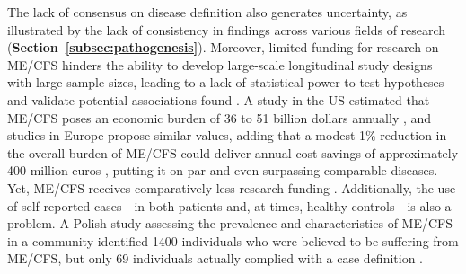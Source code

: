 The lack of consensus on disease definition also generates uncertainty, as illustrated by the lack of consistency in findings across various fields of research (\textbf{Section~\ref{subsec:pathogenesis}}).
Moreover, limited funding for research on ME/CFS hinders the ability to develop large-scale longitudinal study designs with large sample sizes, leading to a lack of statistical power to test hypotheses and validate potential associations found \citep{malato2022ImpactMisclassification}.
A study in the US estimated that ME/CFS poses an economic burden of 36 to 51 billion dollars annually \citep{jason2021UpdatingNational}, and studies in Europe propose similar values, adding that a modest 1\% reduction in the overall burden of ME/CFS could deliver annual cost savings of approximately 400 million euros \citep{mccrone2003EconomicCost, pheby2020DevelopmentConsistent}, putting it on par and even surpassing comparable diseases.
Yet, ME/CFS receives comparatively less research funding \citep{mirin2022UpdatedME}.
Additionally, the use of self-reported cases---in both patients and, at times, healthy controls---is also a problem.
A Polish study assessing the prevalence and characteristics of ME/CFS in a community identified 1400 individuals who were believed to be suffering from ME/CFS, but only 69 individuals actually complied with a case definition \citep{slomko2019PrevalenceCharacteristics}.

